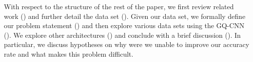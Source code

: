 With respect to the structure of the rest of the paper, we first review related work () and further detail the data set (). 
Given our data set, we formally define our problem statement () and then explore various data sets using the GQ-CNN (). 
We explore other architectures () and conclude with a brief discussion (). 
In particular, we discuss hypotheses on why were we unable to improve our accuracy rate and what makes this problem difficult. 

